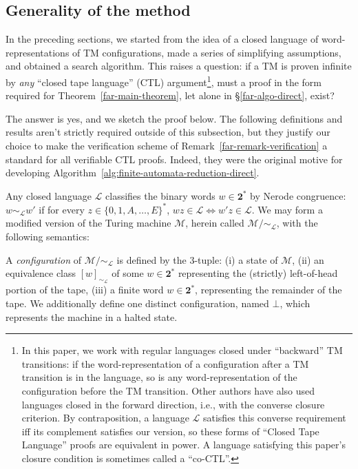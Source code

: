 \subsection{Generality of the method}
In the preceding sections, we started from the idea of a closed language of word-representations of TM configurations, made a series of simplifying assumptions, and obtained a search algorithm.
This raises a question: if a TM is proven infinite by \emph{any} ``closed tape language''  (CTL) argument\footnote{
  In this paper, we work with regular languages closed under ``backward'' TM transitions: if the word-representation of a configuration after a TM transition is in the language, so is any word-representation of the configuration before the TM transition.
  Other authors have also used languages closed in the forward direction, i.e., with the converse closure criterion.
  By contraposition, a language $\mathcal{L}$ satisfies this converse requirement iff its complement satisfies our version, so these forms of ``Closed Tape Language'' proofs are equivalent in power.
  A language satisfying this paper's closure condition is sometimes called a ``co-CTL''.
},
must a proof in the form required for Theorem~\ref{far-main-theorem}, let alone in \S\ref{far-algo-direct}, exist?

The answer is yes, and we sketch the proof below.
The following definitions and results aren't strictly required outside of this subsection, but they justify our choice to make the verification scheme of Remark~\ref{far-remark-verification} a standard for all verifiable CTL proofs.
Indeed, they were the original motive for developing Algorithm~\ref{alg:finite-automata-reduction-direct}.

Any closed language $\mathcal{L}$ classifies the binary words $w\in\mathbf{2}^*$ by Nerode congruence: $w\sim_\mathcal{L} w'$ if for every $z\in\{0,1,A,\ldots,E\}^*$, $wz\in\mathcal{L}\iff w'z\in\mathcal{L}$.
We may form a modified version of the Turing machine $\mathcal{M}$, herein called $\mathcal{M}/\sim_\mathcal{L}$, with the following semantics:

A \textit{configuration} of $\mathcal{M}/\sim_\mathcal{L}$ is defined by the 3-tuple: (i) a state of $\mathcal{M}$, (ii) an equivalence class $[w]_{\sim_\mathcal{L}}$ of some $w\in\mathbf{2}^*$ representing the (strictly) left-of-head portion of the tape,  (iii) a finite word $w\in\mathbf{2}^*$, representing the remainder of the tape.
We additionally define one distinct configuration, named $\bot$, which represents the machine in a halted state.

